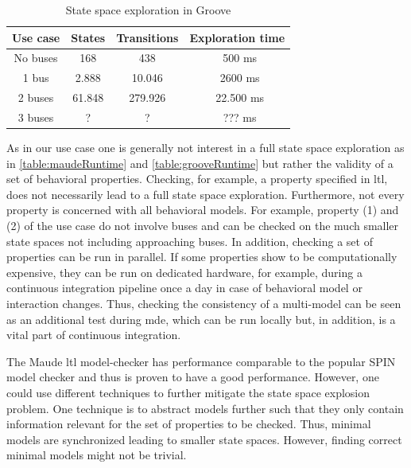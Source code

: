 \documentclass{jot}
\begin{document}

\begin{table}
\centering
\begin{tabular}{|c || c | c | c |}
 \hline
 Use case & States & Transitions & Exploration time \\
 \hline\hline
 No buses & 168 & 438 & ~500 ms \\
 \hline
 1 bus & 2.888 & 10.046 & ~2600 ms \\
 \hline
 2 buses & 61.848 & 279.926 & ~22.500 ms \\
 \hline
 3 buses & ? & ? & ~??? ms \\
 \hline
\end{tabular}
\caption[State space exploration in Groove]{State space exploration in Groove}
\label{table:grooveRuntime}
\end{table}

As in our use case one is generally not interest in a full state space exploration as in \autoref{table:maudeRuntime} and \autoref{table:grooveRuntime} but rather the validity of a set of behavioral properties.
Checking, for example, a property specified in \gls*{ltl}, does not necessarily lead to a full state space exploration.
Furthermore, not every property is concerned with all behavioral models.
For example, property (1) and (2) of the use case do not involve buses and can be checked on the much smaller state spaces not including approaching buses.
In addition, checking a set of properties can be run in parallel.
If some properties show to be computationally expensive, they can be run on dedicated hardware, for example, during a continuous integration pipeline once a day in case of behavioral model or interaction changes.
Thus, checking the consistency of a multi-model can be seen as an additional test during \gls*{mde}, which can be run locally but, in addition, is a vital part of continuous integration.

The Maude \gls*{ltl} model-checker has performance comparable to the popular SPIN model checker \cite{ekerMaudeLTLModel2004} and thus is proven to have a good performance.
However, one could use different techniques to further mitigate the state space explosion problem.
One technique is to abstract models further such that they only contain information relevant for the set of properties to be checked.
Thus, minimal models are synchronized leading to smaller state spaces.
However, finding correct minimal models might not be trivial.
\end{document}
